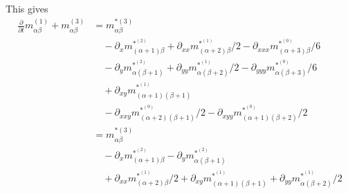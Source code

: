 This gives
\begin{equation}
  \label{eq:third order in epsilon}
  \begin{aligned}
    \frac{\partial}{\partial t} m_{\alpha\beta}^{(1)} + m_{\alpha\beta}^{(3)}
    & =  m_{\alpha\beta}^{*(3)} \\
    &\quad - \partial_x m_{(\alpha+1)\beta}^{*^{(2)}} + \partial_{xx} m_{(\alpha+2)\beta}^{*^{(1)}}/2 - \partial_{xxx} m_{(\alpha+3)\beta}^{*^{(0)}}/6 \\
    &\quad - \partial_y m_{\alpha(\beta+1)}^{*^{(2)}} + \partial_{yy} m_{\alpha(\beta+2)}^{*^{(1)}}/2 - \partial_{yyy} m_{\alpha(\beta+3)}^{*^{(0)}}/6 \\
    &\quad + \partial_{xy} m_{(\alpha+1)(\beta+1)}^{*^{(1)}} \\
    &\quad - \partial_{xxy} m_{(\alpha+2)(\beta+1)}^{*^{(0)}}/2 - \partial_{xyy} m_{(\alpha+1)(\beta+2)}^{*^{(0)}}/2 \\
    & =  m_{\alpha\beta}^{*(3)} \\
    &\quad - \partial_x m_{(\alpha+1)\beta}^{*^{(2)}} - \partial_y m_{\alpha(\beta+1)}^{*^{(2)}}  \\
    &\quad  + \partial_{xx} m_{(\alpha+2)\beta}^{*^{(1)}}/2 + \partial_{xy} m_{(\alpha+1)(\beta+1)}^{*^{(1)}} + \partial_{yy} m_{\alpha(\beta+2)}^{*^{(1)}}/2
  \end{aligned}
\end{equation}

